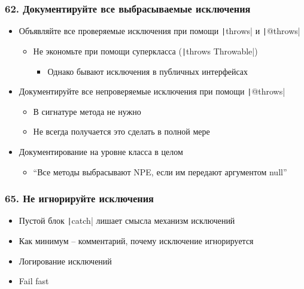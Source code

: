 \documentclass[xetex,mathserif,serif]{beamer}
\begin{document}
	\begin{frame}
		\frametitle{62. Документируйте все выбрасываемые исключения}
		\begin{itemize}
			\item Объявляйте все проверяемые исключения при помощи \texttt|throws| и \texttt|@throws|
			\begin{itemize}
				\item Не экономьте при помощи суперкласса (\texttt|throws Throwable|)
				\begin{itemize}
					\item Однако бывают исключения в публичных интерфейсах
				\end{itemize}
			\end{itemize}
			\item Документируйте все непроверяемые исключения при помощи \texttt|@throws|
			\begin{itemize}
				\item В сигнатуре метода не нужно
				\item Не всегда получается это сделать в полной мере
			\end{itemize}
			\item Документирование на уровне класса в целом
			\begin{itemize}
				\item ``Все методы выбрасывают NPE, если им передают аргументом null''
			\end{itemize}
		\end{itemize}
	\end{frame}

	\begin{frame}
		\frametitle{65. Не игнорируйте исключения}
		\begin{itemize}
			\item Пустой блок \texttt|catch| лишает смысла механизм исключений
			\item Как минимум -- комментарий, почему исключение игнорируется
			\item Логирование исключений
			\item Fail fast
		\end{itemize}
	\end{frame}
\end{document}
